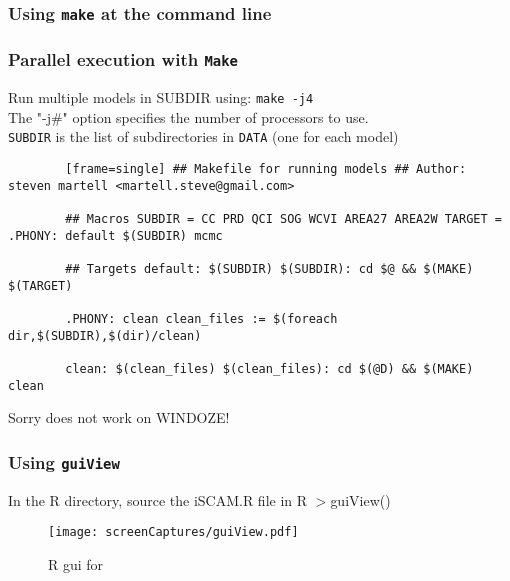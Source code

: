 
%

%
\begin{frame}
	[fragile] \frametitle{Using \texttt{make} at the command line} 
	
\end{frame}
\begin{frame}
	[fragile,shrink=30] \frametitle{Parallel execution with \texttt{Make}} Run multiple models in SUBDIR using: \texttt{make -j4}\\
	The "-j#" option specifies the number of processors to use.\\
	\texttt{SUBDIR} is the list of subdirectories in \texttt{DATA} (one for each model)\\
	\begin{lstlisting}
		[frame=single] ## Makefile for running models ## Author: steven martell <martell.steve@gmail.com>
		
		## Macros SUBDIR = CC PRD QCI SOG WCVI AREA27 AREA2W TARGET = .PHONY: default $(SUBDIR) mcmc
		
		## Targets default: $(SUBDIR) $(SUBDIR): cd $@ && $(MAKE) $(TARGET)
		
		.PHONY: clean clean_files := $(foreach dir,$(SUBDIR),$(dir)/clean)
		
		clean: $(clean_files) $(clean_files): cd $(@D) && $(MAKE) clean 
	\end{lstlisting}
	Sorry does not work on WINDOZE! 
\end{frame}

\begin{frame}
	\frametitle{Using \texttt{guiView}} In the R directory, source the iSCAM.R file in R $>$guiView() 
	\begin{figure}
		[htbp] \centering 
		\texttt{[image: screenCaptures/guiView.pdf]} \caption{R gui for \iscam} \label{fig:screenCaptures_guiView} 
	\end{figure}
\end{frame}

